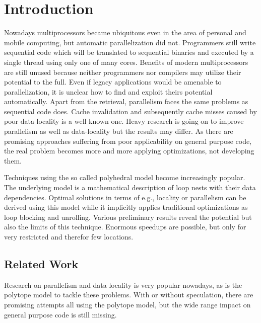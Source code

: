 
\chapter{Introduction} %
\label{Chapter1}


Nowadays multiprocessors became ubiquitous even in the area of personal and 
mobile computing, but automatic parallelization did not. 
Programmers still write sequential code which will be
translated to sequential binaries and executed by a single thread using only
one of many cores. %
Benefits of modern multiprocessors are still unused because neither programmers 
nor compilers may utilize their potential to the full.
Even if legacy applications would be amenable to parallelization, it is unclear 
how to find and exploit theirs potential automatically.  
Apart from the retrieval, parallelism faces the same problems as sequential
code does. Cache invalidation and subsequently cache misses 
caused by poor data-locality is a well known one. 
Heavy research is going on to improve parallelism as well as  data-locality 
but the results may differ.
As there are promising approaches suffering from poor applicability on general 
purpose code, the real problem becomes more and more applying optimizations, not
developing them. 


Techniques using the so called polyhedral model become increasingly popular.
The underlying model is a mathematical description of loop nests with 
their data dependencies. Optimal solutions in terms of e.g., locality or 
parallelism can be derived using this model while it implicitly applies 
traditional optimizations as loop blocking and unrolling. 
Various preliminary results reveal the potential but also the
limits of this technique. Enormous speedups are possible, 
but only for very restricted and therefor few locations.



\section{Related Work}
Research on parallelism and data locality is very popular nowadays, as is the 
polytope model to tackle these problems. With or without speculation, there are
promising attempts all using the polytope model, but the wide range 
impact on general purpose code is still missing.

